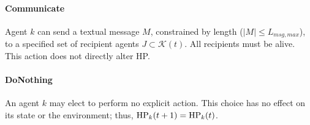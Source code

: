 \paragraph{Communicate}
Agent $k$ can send a textual message $M$, constrained by length ($|M| \le L_{msg,max}$), to a specified set of recipient agents $J \subset \mathcal{K}(t)$. All recipients must be alive. This action does not directly alter HP.

\paragraph{DoNothing}
An agent $k$ may elect to perform no explicit action. This choice has no effect on its state or the environment; thus, $\mathrm{HP}_k(t+1) = \mathrm{HP}_k(t)$.
